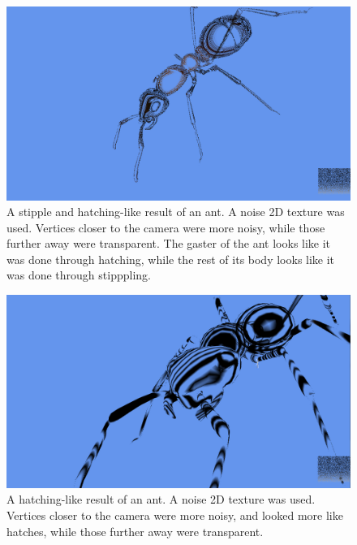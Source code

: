 \documentclass[annual]{acmsiggraph}
\begin{document}
\begin{figure}[h]
	\centering
	\includegraphics[width=5.5in]{images/stipple-hatch-result1}
	\caption{A stipple and hatching-like result of an ant. A noise 2D texture was used. Vertices closer to the camera were more noisy, while those further away were transparent. The gaster of the ant looks like it was done through hatching, while the rest of its body looks like it was done through stipppling.}
	\label{fig:stippleHatch1}
\end{figure}

\begin{figure}[h]
	\centering
	\includegraphics[width=5.5in]{images/stipple-hatch-result2}
	\caption{A hatching-like result of an ant. A noise 2D texture was used. Vertices closer to the camera were more noisy, and looked more like hatches, while those further away were transparent.}
	\label{fig:stippleHatch2}
\end{figure}
\end{document}
